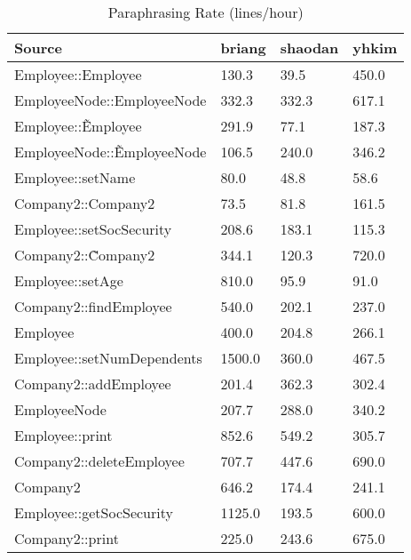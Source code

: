 \begin{table}[hb]
\begin{center}
\begin{tabular}{|l|l|l|l|}
\hline
Source & briang & shaodan & yhkim\\
\hline
Employee::Employee & 130.3 & 39.5 & 450.0\\
EmployeeNode::EmployeeNode & 332.3 & 332.3 & 617.1\\
Employee::\~Employee & 291.9 & 77.1 & 187.3\\
EmployeeNode::\~EmployeeNode & 106.5 & 240.0 & 346.2\\
Employee::setName & 80.0 & 48.8 & 58.6\\
Company2::Company2 & 73.5 & 81.8 & 161.5\\
Employee::setSocSecurity & 208.6 & 183.1 & 115.3\\
Company2::\~Company2 & 344.1 & 120.3 & 720.0\\
Employee::setAge & 810.0 & 95.9 & 91.0\\
Company2::findEmployee & 540.0 & 202.1 & 237.0\\
Employee & 400.0 & 204.8 & 266.1\\
Employee::setNumDependents & 1500.0 & 360.0 & 467.5\\
Company2::addEmployee & 201.4 & 362.3 & 302.4\\
EmployeeNode & 207.7 & 288.0 & 340.2\\
Employee::print & 852.6 & 549.2 & 305.7\\
Company2::deleteEmployee & 707.7 & 447.6 & 690.0\\
Company2 & 646.2 & 174.4 & 241.1\\
Employee::getSocSecurity & 1125.0 & 193.5 & 600.0\\
Company2::print & 225.0 & 243.6 & 675.0\\
\hline
\end{tabular}
\end{center}
\caption{Paraphrasing Rate (lines/hour)}
\end{table}


